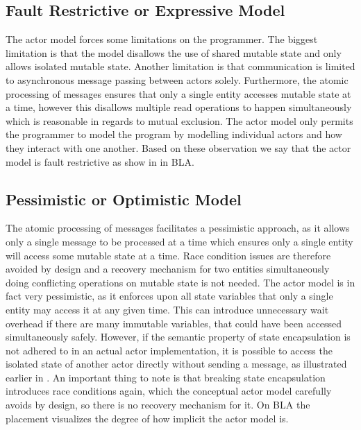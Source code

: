 \subsection{Fault Restrictive or Expressive Model}\label{sec_actor_fault_express}
The actor model forces some limitations on the programmer. The biggest limitation is that the model disallows the use of shared mutable state and only allows isolated mutable state. Another limitation is that communication is limited to asynchronous message passing between actors solely. Furthermore, the atomic processing of messages ensures that only a single entity accesses mutable state at a time, however this disallows multiple read operations to happen simultaneously which is reasonable in regards to mutual exclusion. The actor model only permits the programmer to model the program by modelling individual actors and how they interact with one another. Based on these observation we say that the actor model is fault restrictive as show in in BLA.

\subsection{Pessimistic or Optimistic Model}
The atomic processing of messages facilitates a pessimistic approach, as it allows only a single message to be processed at a time which ensures only a single entity will access some mutable state at a time. Race condition issues are therefore avoided by design and a recovery mechanism for two entities simultaneously doing conflicting operations on mutable state is not needed. The actor model is in fact very pessimistic, as it enforces upon all state variables that only a single entity may access it at any given time. This can introduce unnecessary wait overhead if there are many immutable variables, that could have been accessed simultaneously safely. However, if the semantic property of state encapsulation is not adhered to in an actual actor implementation, it is possible to access the isolated state of another actor directly without sending a message, as illustrated earlier in . An important thing to note is that breaking state encapsulation introduces race conditions again, which the conceptual actor model carefully avoids by design, so there is no recovery mechanism for it. On BLA the placement visualizes the degree of how implicit the actor model is.


